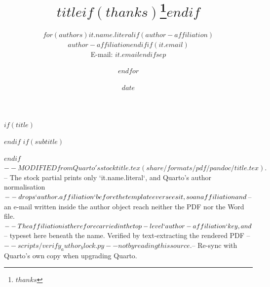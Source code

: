 $if(title)$
\title{$title$$if(thanks)$\thanks{$thanks$}$endif$}
$endif$
$if(subtitle)$
\usepackage{etoolbox}
\makeatletter
\providecommand{\subtitle}[1]{%
  \apptocmd{\@title}{\par {\large #1 \par}}{}{}
}
\makeatother
\subtitle{$subtitle$}
$endif$
$-- MODIFIED from Quarto's stock title.tex (share/formats/pdf/pandoc/title.tex).
$-- The stock partial prints only `it.name.literal`, and Quarto's author normalisation
$-- drops `author.affiliation` before the template ever sees it, so an affiliation and
$-- an e-mail written inside the author object reach neither the PDF nor the Word file.
$-- The affiliation is therefore carried in the top-level `author-affiliation` key, and
$-- typeset here beneath the name. Verified by text-extracting the rendered PDF --
$-- scripts/verify_author_block.py -- not by reading this source.
$-- Re-sync with Quarto's own copy when upgrading Quarto.
\author{$for(authors)$$it.name.literal$$if(author-affiliation)$\\[0.6em]{\normalsize $author-affiliation$}$endif$$if(it.email)$\\[0.2em]{\normalsize E-mail: $it.email$}$endif$$sep$ \and $endfor$}
\date{$date$}
